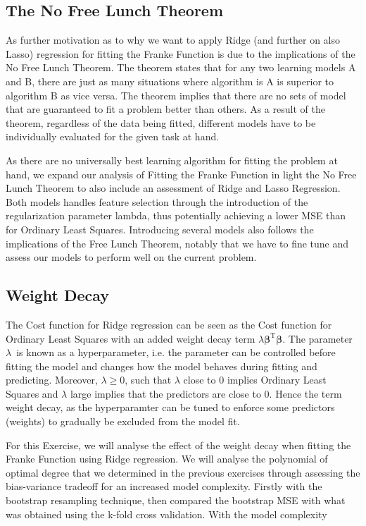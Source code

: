 \documentclass[11pt, a4paper]{article}
\begin{document}
\subsection*{The No Free Lunch Theorem}
As further motivation as to why we want to apply Ridge (and further on also Lasso) regression for fitting the Franke Function is due to the implications of the No Free Lunch Theorem. The theorem states that for any two learning models A and B, there are just as many situations where algorithm is A is superior to algorithm B as vice versa. \cite{Wolpert1996} The theorem implies that there are no sets of model that are guaranteed to fit a problem better than others. As a result of the theorem, regardless of the data being fitted, different models have to be individually evaluated for the given task at hand.

As there are no universally best learning algorithm for fitting the problem at hand, we expand our analysis of Fitting the Franke Function in light the No Free Lunch Theorem to also include an assessment of Ridge and Lasso Regression. Both models handles feature selection through the introduction of the regularization parameter lambda, thus potentially achieving a lower MSE than for Ordinary Least Squares. Introducing several models also follows the implications of the Free Lunch Theorem, notably that we have to fine tune and assess our models to perform well on the current problem. \cite{Goodfellow2016}

\subsection*{Weight Decay}
The Cost function for Ridge regression can be seen as the Cost function for Ordinary Least Squares with an added weight decay term $\lambda\bm{\beta}^\text{T}\bm{\beta}$. The parameter $\lambda$ is known as a hyperparameter, i.e. the parameter can be controlled before fitting the model and changes how the model behaves during fitting and predicting. \cite{Goodfellow2016} Moreover, $\lambda \geq 0$, such that $\lambda$ close to $0$ implies Ordinary Least Squares and $\lambda$ large implies that the predictors are close to $0$. Hence the term weight decay, as the hyperparamter can be tuned to enforce some predictors (weights) to gradually be excluded from the model fit.

For this Exercise, we will analyse the effect of the weight decay when fitting the Franke Function using Ridge regression. We will analyse the polynomial of optimal degree that we determined in the previous exercises through assessing the bias-variance tradeoff for an increased model complexity. Firstly with the bootstrap resampling technique, then compared the bootstrap MSE with what was obtained using the k-fold cross validation. With the model complexity
\end{document}
